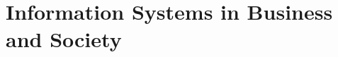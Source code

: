 \documentclass[\main/notes.tex]{subfiles}
\begin{document}
	\setcounter{part}{4}
	\part{Information Systems in Business and Society}

\end{document}
